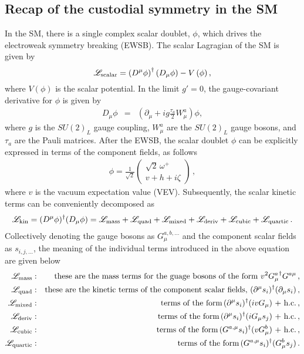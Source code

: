 \documentclass[11pt]{article}
\begin{document}
\subsection{Recap of the custodial symmetry in the SM}
\label{s:recap}
%
In the SM, there is a single complex scalar doublet, $\phi$, which drives the electroweak symmetry breaking (EWSB).  
The scalar Lagragian of the SM is given by
\begin{equation}
\mathscr{L}_{\rm scalar} = \left( D^\mu \phi\right)^\dagger\left( D_\mu \phi\right) - V\left(\phi\right), 
\end{equation}
%
where $V(\phi)$ is the scalar potential.   
In the limit $g'=0$, the gauge-covariant derivative for $\phi$ is given by
%
\begin{eqnarray}	
	\label{e:sm_cd}
	D_\mu \phi &=&\left(\partial_\mu+i g \frac{\tau_a}{2}W_\mu^a\right) \phi ,
\end{eqnarray}
%
where $g$ is the $SU(2)_L$ gauge coupling, $W^a_\mu$ are the $SU(2)_L$ gauge bosons, and $\tau_a$ are the  Pauli matrices.  
After the EWSB, the scalar doublet $\phi$ can be explicitly expressed in terms of the component fields, as follows
%
\begin{eqnarray}
	\label{e:sm_hd}
	\phi=\frac{1}{\sqrt{2}}\begin{pmatrix}
		\sqrt{2} \, \omega^+ \\
		v+h+i \zeta
	\end{pmatrix} \, , 
\end{eqnarray}
%
where $v$ is the vacuum expectation value (VEV).  
Subsequently, the scalar kinetic terms can be conveniently decomposed as\cite{Kundu:2021pcg}
%
\begin{eqnarray}
	\label{e:lgn}
	\mathscr{L}_{\rm{kin}}= (D^\mu \phi)^\dagger (D_\mu \phi)	=\mathscr{L}_{\rm{mass}} +\mathscr{L}_{\rm{quad}}+ \mathscr{L}_{\rm{mixed}}+\mathscr{L}_{\rm{deriv}}+\mathscr{L}_{\rm{cubic}}+\mathscr{L}_{\rm{quartic}} \, .
\end{eqnarray}
%
Collectively denoting the gauge bosons as $G_\mu^{a, b, ...}$ and the component scalar fields as $s_{i,j,...}$, the meaning of the individual terms introduced in the above equation are given below
\begin{eqnarray}
	\mathscr{L}_{\rm{mass}}:&&\text{these are the mass terms for the guage bosons of the form $v^2 {G_\mu^a}^\dagger G^{a\mu}$}\, ,\nonumber\\
	\mathscr{L}_{\rm{quad}}:&&\text{these are the kinetic terms of the component scalar fields, $(\partial^\mu s_i)^\dagger (\partial_\mu s_i)$}\, ,\nonumber\\
	\mathscr{L}_{\rm{mixed}}:&&\text{terms of the form} \, (\partial^\mu s_i)^\dagger  (iv G_\mu)  \text{ + h.c.}\, ,\nonumber\\
	\mathscr{L}_{\rm{deriv}}:&&\text{terms of the form} \, (\partial^\mu s_i)^\dagger (iG_\mu s_j) \text{ + h.c.} \, ,\nonumber\\
	\mathscr{L}_{\rm{cubic}}:&&\text{terms of the form} \, (G^{a,\mu} s_i)^\dagger (vG^b_\mu ) \text{ + h.c.}\, ,\nonumber\\
	\mathscr{L}_{\rm{quartic}}:&&\text{terms of the form} \, (G^{a,\mu} s_i)^\dagger(G^b_\mu s_j)\, .\nonumber
\end{eqnarray}
\end{document}
